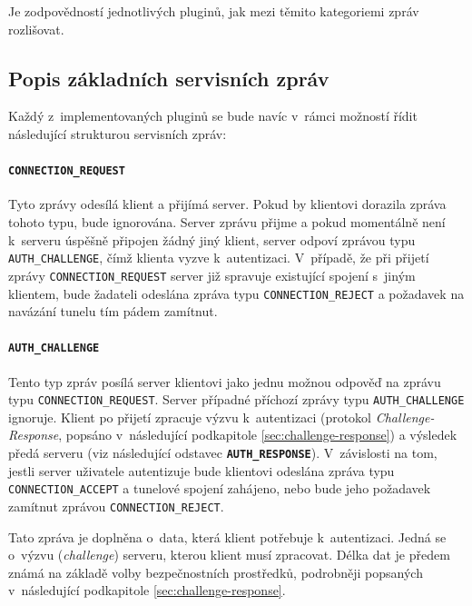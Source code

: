\documentclass[thesis=M,czech]{FITthesis}[2012/10/20]
\begin{document}
Je zodpovědností jednotlivých pluginů, jak mezi těmito kategoriemi zpráv rozlišovat. 

\subsection{Popis základních servisních zpráv}
\label{subsec:msg-types}

Každý z~implementovaných pluginů se bude navíc v~rámci možností řídit následující strukturou servisních zpráv:

  \paragraph{\texttt{CONNECTION\_REQUEST}}
  
    Tyto zprávy odesílá klient a přijímá server. Pokud by klientovi dorazila zpráva tohoto typu, bude ignorována. Server zprávu přijme a pokud momentálně není k~serveru úspěšně připojen žádný jiný klient, server odpoví zprávou typu \texttt{AUTH\_CHALLENGE}, čímž klienta vyzve k~autentizaci. V~případě, že při přijetí zprávy \texttt{CONNECTION\_REQUEST} server již spravuje existující spojení s~jiným klientem, bude žadateli odeslána zpráva typu \texttt{CONNECTION\_REJECT} a požadavek na navázání tunelu tím pádem zamítnut.
    
  \paragraph{\texttt{AUTH\_CHALLENGE}}
  
    Tento typ zpráv posílá server klientovi jako jednu možnou odpověď na zprávu typu \texttt{CONNECTION\_REQUEST}. Server případné příchozí zprávy typu \texttt{AUTH\_CHALLENGE} ignoruje. Klient po přijetí zpracuje výzvu k~autentizaci (protokol \textit{Challenge-Response}, popsáno v~následující podkapitole \ref{sec:challenge-response}) a výsledek předá serveru (viz následující odstavec \textbf{\texttt{AUTH\_RESPONSE}}). V~závislosti na tom, jestli server uživatele autentizuje bude klientovi odeslána zpráva typu \texttt{CONNECTION\_ACCEPT} a tunelové spojení zahájeno, nebo bude jeho požadavek zamítnut zprávou \texttt{CONNECTION\_REJECT}.
    
    Tato zpráva je doplněna o~data, která klient potřebuje k~autentizaci. Jedná se o~výzvu (\textit{challenge}) serveru, kterou klient musí zpracovat. Délka dat je předem známá na základě volby bezpečnostních prostředků, podrobněji popsaných v~následující podkapitole \ref{sec:challenge-response}.
    
\end{document}
